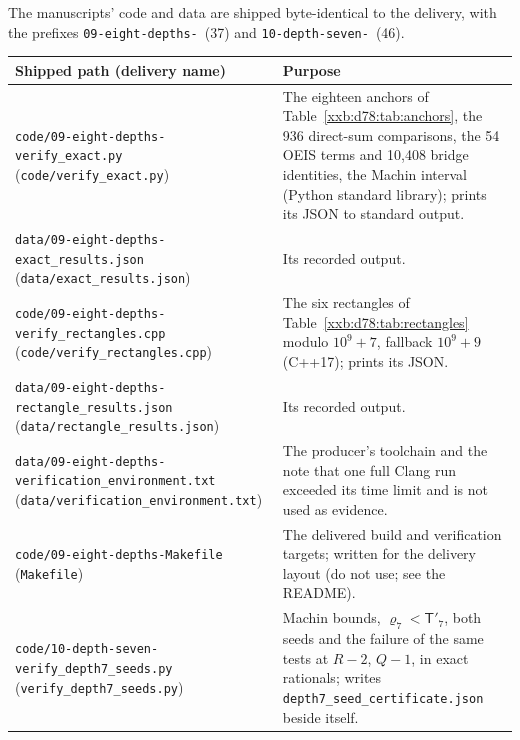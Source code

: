\documentclass[11pt,a4paper]{article}
\numberwithin{equation}{section}
\theoremstyle{definition}
\theoremstyle{remark}
\theoremstyle{plain}
\begin{document}
The manuscripts' code and data are shipped byte-identical to the delivery,
with the prefixes \texttt{09-eight-\allowbreak depths-}~(37) and
\texttt{10-depth-\allowbreak seven-}~(46).
\begingroup
\renewcommand{\theHtable}{xxb.d78.files}%
\begin{longtable}{@{}>{\raggedright\arraybackslash}p{}>{\raggedright\arraybackslash}p{}@{}}
\toprule
Shipped path (delivery name) & Purpose\\
\midrule
\endhead
\texttt{code/09-eight-\allowbreak depths-\allowbreak verify\_exact.py} (\texttt{code/\allowbreak verify\_\allowbreak exact.py}) & The eighteen anchors of Table~\ref{xxb:d78:tab:anchors}, the 936 direct-sum comparisons, the 54 OEIS terms and 10,408 bridge identities, the Machin interval (Python standard library); prints its JSON to standard output.\\
\texttt{data/09-eight-\allowbreak depths-\allowbreak exact\_results.json} (\texttt{data/\allowbreak exact\_\allowbreak results.json}) & Its recorded output.\\
\texttt{code/09-eight-\allowbreak depths-\allowbreak verify\_rectangles.cpp} (\texttt{code/\allowbreak verify\_\allowbreak rectangles.cpp}) & The six rectangles of Table~\ref{xxb:d78:tab:rectangles} modulo $10^9+7$, fallback $10^9+9$ (C++17); prints its JSON.\\
\texttt{data/09-eight-\allowbreak depths-\allowbreak rectangle\_results.json} (\texttt{data/\allowbreak rectangle\_\allowbreak results.json}) & Its recorded output.\\
\texttt{data/09-eight-\allowbreak depths-\allowbreak verification\_environment.txt} (\texttt{data/\allowbreak verification\_\allowbreak environment.txt}) & The producer's toolchain and the note that one full Clang run exceeded its time limit and is not used as evidence.\\
\texttt{code/09-eight-\allowbreak depths-\allowbreak Makefile} (\texttt{Makefile}) & The delivered build and verification targets; written for the delivery layout (do not use; see the README).\\
\texttt{code/10-depth-\allowbreak seven-\allowbreak verify\_depth7\_seeds.py} (\texttt{verify\_\allowbreak depth7\_\allowbreak seeds.py}) & Machin bounds, $\varrho_7<\mathsf T'_7$, both seeds and the failure of the same tests at $R-2$, $Q-1$, in exact rationals; writes \texttt{depth7\_\allowbreak seed\_\allowbreak certificate.json} beside itself.\\

\end{longtable}
\end{document}
